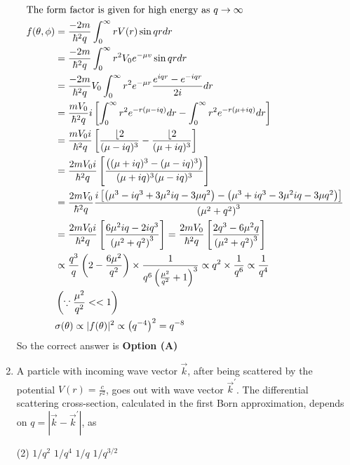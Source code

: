 \begin{enumerate}
\begin{answer}
\begin{align*}
\intertext{The form factor is given for high energy as $q \rightarrow \infty$}
f(\theta, \phi)&=\frac{-2 m}{\hbar^{2} q} \int_{0}^{\infty} r V(r) \sin q r d r\\&=\frac{-2 m}{\hbar^{2} q} \int_{0}^{\infty} r^{2} V_{0} e^{-\mu v} \sin q r d r\\
&=\frac{-2 m}{\hbar^{2} q} V_{0} \int_{0}^{\infty} r^{2} e^{-\mu r} \frac{e^{i q r}-e^{-i q r}}{2 i} d r\\&=\frac{m V_{0}}{\hbar^{2} q} i\left[\int_{0}^{\infty} r^{2} e^{-r(\mu-i q)} d r-\int_{0}^{\infty} r^{2} e^{-r(\mu+i q)} d r\right]\\
&=\frac{m V_{0} i}{\hbar^{2} q}\left[\frac{\lfloor 2}{(\mu-i q)^{3}}-\frac{\lfloor 2}{(\mu+i q)^{3}}\right]\\&=\frac{2 m V_{0} i}{\hbar^{2} q}\left[\frac{\left((\mu+i q)^{3}-(\mu-i q)^{3}\right)}{(\mu+i q)^{3}(\mu-i q)^{3}}\right]\\
&=\frac{2 m V_{0}}{\hbar^{2} q} \frac{i\left[\left(\mu^{3}-i q^{3}+3 \mu^{2} i q-3 \mu q^{2}\right)-\left(\mu^{3}+i q^{3}-3 \mu^{2} i q-3 \mu q^{2}\right)\right]}{\left(\mu^{2}+q^{2}\right)^{3}}\\
&=\frac{2 m V_{0} i}{\hbar^{2} q}\left[\frac{6 \mu^{2} i q-2 i q^{3}}{\left(\mu^{2}+q^{2}\right)^{3}}\right]=\frac{2 m V_{0}}{\hbar^{2} q}\left[\frac{2 q^{3}-6 \mu^{2} q}{\left(\mu^{2}+q^{2}\right)^{3}}\right]\\
&\propto \frac{q^{3}}{q}\left(2-\frac{6 \mu^{2}}{q^{2}}\right) \times \frac{1}{q^{6}\left(\frac{\mu^{2}}{q^{2}}+1\right)^{3}} \propto q^{2} \times \frac{1}{q^{6}} \propto \frac{1}{q^{4}} \\&\left(\because \frac{\mu^{2}}{q^{2}}<<1\right)\\
&\sigma(\theta) \propto|f(\theta)|^{2} \propto\left(q^{-4}\right)^{2}=q^{-8}
\end{align*}
So the correct answer is \textbf{Option (A)}
\end{answer}
\item A particle with incoming wave vector $\vec{k}$, after being scattered by the potential $V(r)=\frac{c}{r^{2}}$, goes out with wave vector $\vec{k}^{\prime}$. The differential scattering cross-section, calculated in the first Born approximation, depends on $q=\left|\vec{k}-\vec{k}^{\prime}\right|$, as
{}
\begin{tasks}(2)
\task[\textbf{A.}] $1 / q^{2}$
\task[\textbf{B.}] $1 / q^{4}$
\task[\textbf{C.}]  $1 / q$
\task[\textbf{D.}] $1 / q^{3 / 2}$

\end{tasks}
\end{enumerate}
